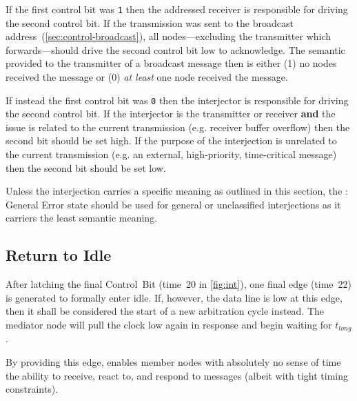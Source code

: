 If the first control bit was {\tt 1} then the addressed receiver is
responsible for driving the second control bit. If the transmission was sent
to the broadcast address~(\ref{sec:control-broadcast}), all nodes---excluding
the transmitter which forwards---should drive the second control bit low to
acknowledge. The semantic provided to the transmitter of a broadcast message
then is either (1) no nodes received the message or (0) {\em at least} one
node received the message.

If instead the first control bit was {\tt 0} then the interjector is
responsible for driving the second control bit. If the interjector is the
transmitter or receiver {\bf and} the issue is related to the current
transmission (e.g. receiver buffer overflow) then the second bit should be set
high. If the purpose of the interjection is unrelated to the current
transmission (e.g. an external, high-priority, time-critical message) then the
second bit should be set low.

Unless the interjection carries a specific meaning as outlined in this
section, the {: General Error} state should be used for general or
unclassified interjections as it carriers the least semantic meaning.

\subsection{Return to Idle}
\label{sec:bus-return-idle}
After latching the final Control~Bit (time~20 in \cref{fig:int}), one final
edge (time~22) is generated to formally enter {\sc idle}. If, however, the
data line is low at this edge, then it shall be considered the start of a new
arbitration cycle instead. The mediator node will pull the clock low again in
response and begin waiting for $t_{long}$.

By providing this edge, \bus enables member nodes with absolutely no sense of
time the ability to receive, react to, and respond to messages (albeit with
tight timing constraints).
